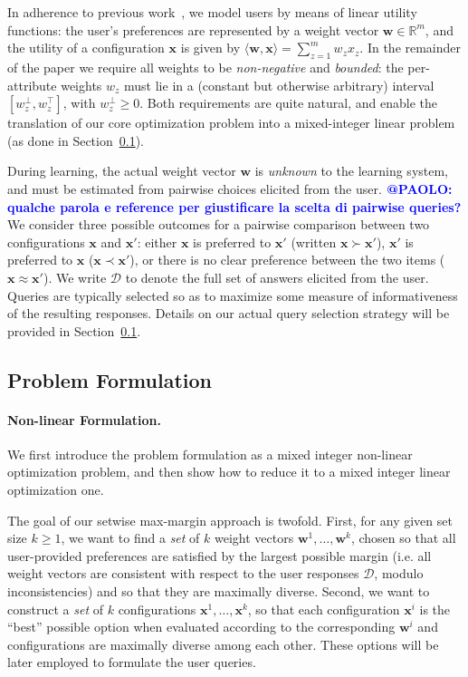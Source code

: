 \documentclass{article}
\renewcommand\[{\begin{equation}}
\renewcommand\]{\end{equation}}
\newcommand{\bbR}{\mathbb{R}}
\newcommand{\calvar}[1]{\ensuremath{\mathcal{#1}}}
\newcommand{\calD}{\calvar{D}}
\newcommand{\vecvar}[1]{\ensuremath{\boldsymbol{#1}}}
\newcommand{\vw}{\vecvar{w}}
\newcommand{\vx}{\vecvar{x}}
\newcommand{\andrea}[1]{{\bf \textcolor{blue}{{\fbox{Andrea:} #1}}}}
\begin{document}
In adherence to previous work~\cite{guo2010real,viappiani2010optimal}, we model users by means
of linear utility functions: the user's preferences are represented by a weight
vector $\vw\in\bbR^m$, and the utility of a configuration $\vx$ is given by
$\langle \vw, \vx \rangle = \sum_{z=1}^m w_z x_z$. In the remainder of the paper we
require all weights to be {\em non-negative} and {\em bounded}: the per-attribute
weights $w_z$ must lie in a (constant but otherwise arbitrary) interval
$[w^\bot_z, w^\top_z]$, with $w^\bot_z \ge 0$. Both requirements are quite
natural, and enable the translation of our core optimization problem into a
mixed-integer linear problem (as done in Section~\ref{sec:formulation}).

During learning, the actual weight vector $\vw$ is {\em unknown} to the
learning system, and must be estimated from pairwise choices elicited from the
user.\andrea{@PAOLO: qualche parola e reference per giustificare la scelta di pairwise queries?}  We consider three possible outcomes for a pairwise comparison between
two configurations $\vx$ and $\vx'$: either $\vx$ is preferred to $\vx'$ (written
$\vx \succ \vx'$), $\vx'$ is preferred to $\vx$ ($\vx \prec \vx'$), or there is
no clear preference between the two items ($\vx \approx \vx'$). We write
$\calD$ to denote the full set of answers elicited from the user. Queries are
typically selected so as to maximize some measure of informativeness of the
resulting responses.  Details on our actual query selection strategy will be
provided in Section~\ref{sec:formulation}.

\subsection{Problem Formulation}
\label{sec:formulation}

\paragraph{Non-linear Formulation.} We first introduce the problem
formulation as a mixed integer non-linear optimization problem, and
then show how to reduce it to a mixed integer linear optimization one.

The goal of our setwise max-margin approach is twofold. First, for any
given set size $k\geq 1$, we want to find a {\em set} of $k$ weight
vectors $\vw^{1}, \ldots, \vw^{k}$, chosen so that all user-provided
preferences are satisfied by the largest possible margin (i.e. all
weight vectors are consistent with respect to the user responses
$\calD$, modulo inconsistencies) and so that they are maximally
diverse.  Second, we want to construct a {\em set} of $k$
configurations $\vx^{1}, \ldots, \vx^{k}$, so that each configuration
$\vx^{i}$ is the ``best'' possible option when evaluated according to
the corresponding $\vw^{i}$ and configurations are maximally diverse
among each other. These options will be later employed to formulate
the user queries.
\end{document}
